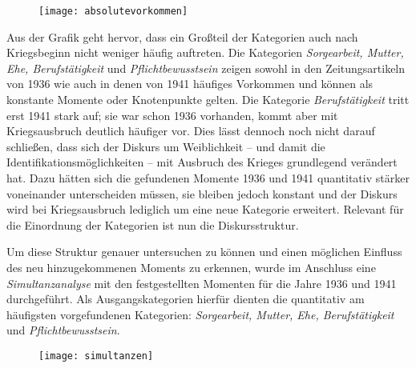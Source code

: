 \documentclass[12pt, titlepage=true, toc=bib]{scrartcl}
\begin{document}
\begin{figure}[H]
\centering
\texttt{[image: absolutevorkommen]}%
\end{figure}
 
\noindent Aus der Grafik geht hervor, dass ein Großteil der Kategorien auch nach Kriegsbeginn nicht weniger häufig auftreten. Die Kategorien \textit{Sorgearbeit, Mutter, Ehe, Berufstätigkeit} und \textit{Pflichtbewusstsein} zeigen sowohl in den Zeitungsartikeln von 1936 wie auch in denen von 1941 häufiges Vorkommen und können als konstante Momente oder Knotenpunkte gelten. Die Kategorie \textit{Berufstätigkeit} tritt erst 1941 stark auf; sie war schon 1936 vorhanden, kommt aber mit Kriegsausbruch deutlich häufiger vor. Dies lässt dennoch noch nicht darauf schließen, dass sich der Diskurs um Weiblichkeit -- und damit die Identifikationsmöglichkeiten -- mit Ausbruch des Krieges grundlegend verändert hat. Dazu hätten sich die gefundenen Momente 1936 und 1941 quantitativ stärker voneinander unterscheiden müssen, sie bleiben jedoch konstant und der Diskurs wird bei Kriegsausbruch lediglich um eine neue Kategorie erweitert. Relevant für die Einordnung der Kategorien ist nun die Diskursstruktur.

Um diese Struktur genauer untersuchen zu können und einen möglichen Einfluss des neu hinzugekommenen Moments zu erkennen, wurde im Anschluss eine \textit{Simultanzanalyse} mit den festgestellten Momenten für die Jahre 1936 und 1941 durchgeführt. Als Ausgangskategorien hierfür dienten die quantitativ am häufigsten vorgefundenen Kategorien: \textit{Sorgearbeit, Mutter, Ehe, Berufstätigkeit} und \textit{Pflichtbewusstsein}.

\begin{figure}[H] %
\centering
\texttt{[image: simultanzen]}%
 \label{tab:simultanzen}
\end{figure}
\end{document}
